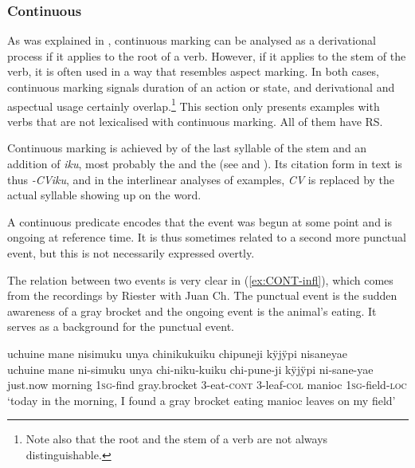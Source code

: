 \subsubsection{Continuous}\label{sec:ContinuousAspect}

As was explained in , continuous marking can be analysed as a derivational process if it applies to the root of a verb. However, if it applies to the stem of the verb, it is often used in a way that resembles aspect marking. In both cases, continuous marking signals duration of an action or state, and derivational and aspectual usage certainly overlap.\footnote{Note also that the root and the stem of a verb are not always distinguishable.} This section only presents examples with verbs that are not lexicalised with continuous marking. All of them have  RS.

Continuous marking is achieved by  of the last syllable of the stem and an addition of \textit{iku}, most probably the  and the  (see  and ). Its citation form in text is thus \textit{-CViku}, and in the interlinear analyses of examples, \textit{CV} is replaced by the actual syllable showing up on the word.

A continuous predicate encodes that the event was begun at some point and is ongoing at reference time. It is thus sometimes related to a second more punctual event, but this is not necessarily expressed overtly.

The relation between two events is very clear in (\ref{ex:CONT-infl}), which comes from the recordings by Riester with Juan Ch. The punctual event is the sudden awareness of a gray brocket and the ongoing event is the animal’s eating. It serves as a background for the punctual event.

\ea\label{ex:CONT-infl}
\begingl
\glpreamble uchuine mane nisimuku unya chinikukuiku chipuneji kÿjÿpi nisaneyae\\
\gla uchuine mane ni-simuku unya chi-niku-kuiku chi-pune-ji kÿjÿpi ni-sane-yae\\
\glb just.now morning 1\textsc{sg}-find gray.brocket 3-eat-\textsc{cont} 3-leaf-\textsc{col} manioc 1\textsc{sg}-field-\textsc{loc}\\
\glft ‘today in the morning, I found a gray brocket eating manioc leaves on my field’
\endgl
\trailingcitation{[nxx-a630101g-1.51]}
\xe

